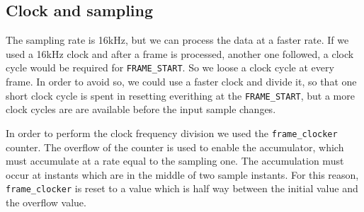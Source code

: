 
\subsection{Clock and sampling}
The sampling rate is 16\si{\kilo\hertz}, but we can process the data at a faster
rate. If we used a 16\si{\kilo\hertz} clock and after a frame is processed,
another one followed, a clock cycle would be required for \texttt{FRAME\_START}.
So we loose a clock cycle at every frame. In order to avoid so, we could use a
faster clock and divide it, so that one short clock cycle is spent in resetting
everithing at the \texttt{FRAME\_START}, but a more clock cycles are are
available before the input sample changes.

In order to perform the clock frequency division we used the
\texttt{frame\_clocker} counter.
The overflow of the counter is used to enable the accumulator, which must
accumulate at a rate equal to the sampling one.
The accumulation must occur at instants which are in the middle of two sample
instants. For this reason, \texttt{frame\_clocker} is reset to a value which is
half way between the initial value and the overflow value.
